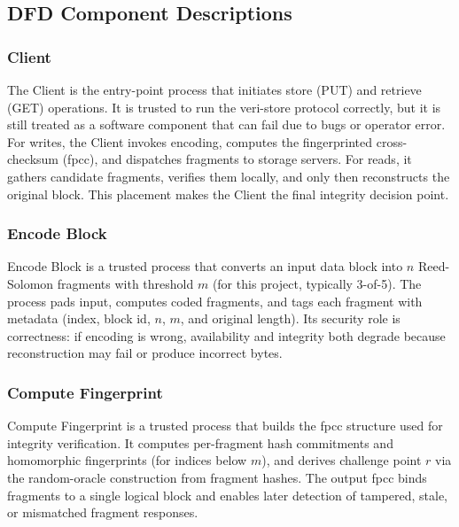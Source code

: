 \documentclass[../veristore_security_model.tex]{subfiles}
\begin{document}
\subsection{DFD Component Descriptions}


\subsubsection{Client}

The Client is the entry-point process that initiates store (PUT) and retrieve (GET) operations.
It is trusted to run the veri-store protocol correctly, but it is still treated as a software
component that can fail due to bugs or operator error. For writes, the Client invokes encoding,
computes the fingerprinted cross-checksum (fpcc), and dispatches fragments to storage servers.
For reads, it gathers candidate fragments, verifies them locally, and only then reconstructs the
original block. This placement makes the Client the final integrity decision point.

\subsubsection{Encode Block}

Encode Block is a trusted process that converts an input data block into $n$ Reed-Solomon
fragments with threshold $m$ (for this project, typically 3-of-5). The process pads input,
computes coded fragments, and tags each fragment with metadata (index, block id, $n$, $m$, and
original length). Its security role is correctness: if encoding is wrong, availability and
integrity both degrade because reconstruction may fail or produce incorrect bytes.

\subsubsection{Compute Fingerprint}

Compute Fingerprint is a trusted process that builds the fpcc structure used for integrity
verification. It computes per-fragment hash commitments and homomorphic fingerprints (for indices
below $m$), and derives challenge point $r$ via the random-oracle construction from fragment
hashes. The output fpcc binds fragments to a single logical block and enables later detection of
tampered, stale, or mismatched fragment responses.
\end{document}
